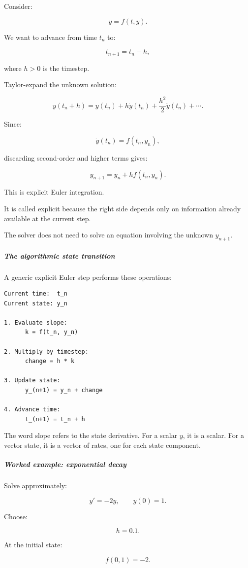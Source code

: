 Consider:

\[
\dot y=f(t,y).
\]

We want to advance from time \(t_n\) to:

\[
t_{n+1}=t_n+h,
\]

where \(h>0\) is the timestep.

Taylor-expand the unknown solution:

\[
y(t_n+h) = y(t_n) + h\dot y(t_n) + \frac{h^2}{2}\ddot y(t_n) +\cdots.
\]

Since:

\[
\dot y(t_n)=f(t_n,y_n),
\]

discarding second-order and higher terms gives:

\[
\boxed{ y_{n+1}=y_n+h f(t_n,y_n) }.
\]

This is explicit Euler integration.

It is called explicit because the right side depends only on information already available at the current step.

The solver does not need to solve an equation involving the unknown \(y_{n+1}\).

\subparagraph{The algorithmic state transition}\label{02-foundations-ii-ch025-the-algorithmic-state-transition}

A generic explicit Euler step performs these operations:

\begin{verbatim}
Current time:  t_n
Current state: y_n

1. Evaluate slope:
      k = f(t_n, y_n)

2. Multiply by timestep:
      change = h * k

3. Update state:
      y_(n+1) = y_n + change

4. Advance time:
      t_(n+1) = t_n + h
\end{verbatim}

The word slope refers to the state derivative. For a scalar \(y\), it is a scalar. For a vector state, it is a vector of rates, one for each state component.

\subparagraph{Worked example: exponential decay}\label{02-foundations-ii-ch025-worked-example-exponential-decay}

Solve approximately:

\[
y'=-2y,\qquad y(0)=1.
\]

Choose:

\[
h=0.1.
\]

At the initial state:

\[
f(0,1)=-2.
\]


